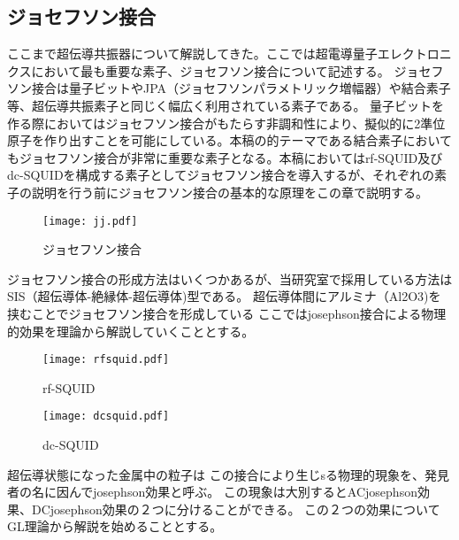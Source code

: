     \subsection{ジョセフソン接合}
            ここまで超伝導共振器について解説してきた。ここでは超電導量子エレクトロニクスにおいて最も重要な素子、ジョセフソン接合について記述する。
            ジョセフソン接合は量子ビットやJPA（ジョセフソンパラメトリック増幅器）や結合素子等、超伝導共振素子と同じく幅広く利用されている素子である。
            量子ビットを作る際においてはジョセフソン接合がもたらす非調和性により、擬似的に2準位原子を作り出すことを可能にしている。本稿の的テーマである結合素子においてもジョセフソン接合が非常に重要な素子となる。本稿においてはrf-SQUID及びdc-SQUIDを構成する素子としてジョセフソン接合を導入するが、それぞれの素子の説明を行う前にジョセフソン接合の基本的な原理をこの章で説明する。
            \begin{figure}[H]
                \centering
                \texttt{[image: jj.pdf]}
                \caption{ジョセフソン接合}
            \end{figure}
            ジョセフソン接合の形成方法はいくつかあるが、当研究室で採用している方法はSIS（超伝導体-絶縁体-超伝導体)型である。
            超伝導体間にアルミナ（Al2O3)を挟むことでジョセフソン接合を形成している
            ここではjosephson接合による物理的効果を理論から解説していくこととする。

            \begin{figure}[H]
                \begin{minipage}[t]{0.5\columnwidth}
                    \centering
                    \texttt{[image: rfsquid.pdf]}
                    \caption{rf-SQUID}
                \end{minipage}%
                \begin{minipage}[t]{0.5\columnwidth}
                    \centering
                    \texttt{[image: dcsquid.pdf]}
                    \caption{dc-SQUID}
                \end{minipage}
            \end{figure}
            超伝導状態になった金属中の粒子は
            この接合により生じsる物理的現象を、発見者の名に因んでjosephson効果と呼ぶ。
            この現象は大別するとACjosephson効果、DCjosephson効果の２つに分けることができる。
            この２つの効果についてGL理論から解説を始めることとする。
